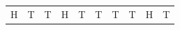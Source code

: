 {\begin{center}
\begin{xtabular*}{\mytablewidth}[t]{|p{10\mystarwidth}|p{10\mystarwidth}|p{10\mystarwidth}|p{10\mystarwidth}|p{10\mystarwidth}|p{10\mystarwidth}|p{10\mystarwidth}|p{10\mystarwidth}|p{10\mystarwidth}|p{10\mystarwidth}|}
    
        H &
    
    
        T &
    
    
        T &
    
    
        H &
    
    
        T &
    
    
        T &
    
    
        T &
    
    
        T &
    
    
        H &
    
    
        T%
     \tabularnewline{}
    

\end{xtabular*}
\end{center}}
